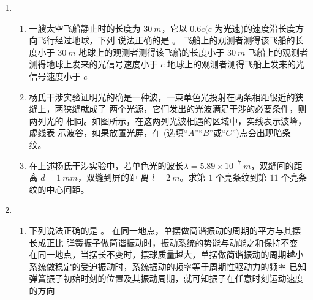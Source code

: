 \begin{enumerate}
\begin{enumerate}
\banswer{
	$ 150 \degree  $
}


\end{enumerate}


\item 
{}
\begin{enumerate}
	\item
一艘太空飞船静止时的长度为 $ 30 \ m $，它以 $ 0.6c(c $ 为光速)的速度沿长度方向飞行经过地球，下列
说法正确的是 \underlinegap 。
\fourchoices
{飞船上的观测者测得该飞船的长度小于 $ 30 \ m $}
{地球上的观测者测得该飞船的长度小于 $ 30 \ m $}
{飞船上的观测者测得地球上发来的光信号速度小于 $ c $}
{地球上的观测者测得飞船上发来的光信号速度小于 $ c $}



\item 
杨氏干涉实验证明光的确是一种波，一束单色光投射在两条相距很近的狭缝上，两狭缝就成了
两个光源，它们发出的光波满足干涉的必要条件，则两列光的 \underlinegap 
相同。如图所示，在这两列光波相遇的区域中，实线表示波峰，虚线表
示波谷，如果放置光屏，在 \underlinegap (选填“$ A $”“$ B $”或“$ C $”)点会出现暗条
纹。
\begin{figure}[h!]
	\centering
	
\end{figure}



\item 
在上述杨氏干涉实验中，若单色光的波长$ \lambda =5.89 \times 10^{-7} \ m $，双缝间的距离 $ d=1 \ mm $，双缝到屏的距
离 $ l=2 \ m $。求第 $ 1 $ 个亮条纹到第 $ 11 $ 个亮条纹的中心间距。


	
\end{enumerate}


\item 
{}
\begin{enumerate}
	\item
下列说法正确的是 \underlinegap 。
\fivechoices
{在同一地点，单摆做简谐振动的周期的平方与其摆长成正比}
{弹簧振子做简谐振动时，振动系统的势能与动能之和保持不变}
{在同一地点，当摆长不变时，摆球质量越大，单摆做简谐振动的周期越小}
{系统做稳定的受迫振动时，系统振动的频率等于周期性驱动力的频率}
{已知弹簧振子初始时刻的位置及其振动周期，就可知振子在任意时刻运动速度的方向}




\end{enumerate}
\end{enumerate}
